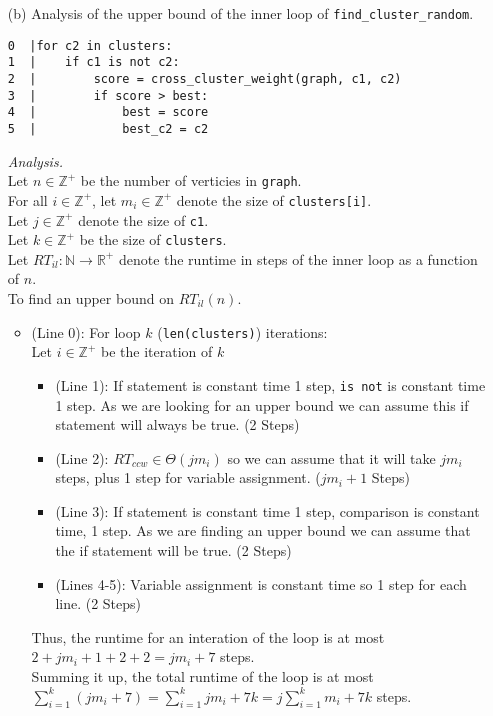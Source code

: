 \documentclass[11pt]{article}
\newcommand{\Z}{\mathbb{Z}}
\begin{document}
\begin{enumerate}
\begin{enumerate}
\item[(b)]
Analysis of the upper bound of the inner loop of \texttt{find\_cluster\_random}.
\begin{verbatim}
0  |for c2 in clusters:
1  |    if c1 is not c2:
2  |        score = cross_cluster_weight(graph, c1, c2)
3  |        if score > best:
4  |            best = score
5  |            best_c2 = c2
\end{verbatim}
\textit{Analysis.}\\
Let $n \in \Z^+$ be the number of verticies in \texttt{graph}.\\
For all $i \in \Z^+$, let $m_i \in \Z^+$ denote the size of \texttt{clusters[i]}.\\
Let $j \in \Z^+$ denote the size of \texttt{c1}.\\
Let $k \in \Z^+$ be the size of \texttt{clusters}.\\
Let $RT_{il} : \mathbb{N} \to \mathbb{R}^+$ denote the runtime in steps of the inner loop as a function of $n$.\\
To find an upper bound on $RT_{il}(n)$.
\begin{itemize}
    \item (Line 0): For loop $k$ (\texttt{len(clusters)}) iterations:\\
    Let $i \in \Z^+$ be the iteration of $k$ 
    \begin{itemize}
        \item (Line 1): If statement is constant time 1 step, \texttt{is not} is constant time 1 step. 
        As we are looking for an upper bound we can assume this if statement will always be true. (2 Steps)
        \item (Line 2): $RT_{ccw} \in \Theta(j m_i)$ so we can assume that it will take $j m_i$ steps, 
        plus 1 step for variable assignment. ($j m_i + 1$ Steps)
        \item (Line 3): If statement is constant time 1 step, comparison is constant time, 1 step. 
        As we are finding an upper bound we can assume that the if statement will be true. (2 Steps)
        \item (Lines 4-5): Variable assignment is constant time so 1 step for each line. (2 Steps)
    \end{itemize}
    Thus, the runtime for an interation of the loop is at most $2 + j m_i + 1 + 2 + 2 = j m_i + 7$ steps.\\
    Summing it up, the total runtime of the loop is at most $\displaystyle \sum_{i = 1}^{k} (j m_i + 7) = \sum_{i = 1}^{k} j m_i + 7k = j\sum_{i = 1}^{k} m_i + 7k$ steps.

\end{itemize}
\end{enumerate}
\end{enumerate}
\end{document}
